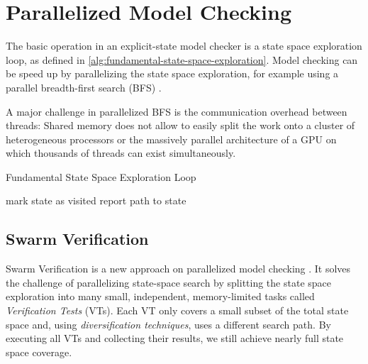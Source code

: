 \documentclass[
fancyheadings, %
%
%
]{stsreprt}
\begin{document}
\section{Parallelized Model Checking}
\label{section:background:parallelized-model-checking}

The basic operation in an explicit-state model checker is a state space exploration loop, as defined in \cref{alg:fundamental-state-space-exploration}.
Model checking can be speed up by parallelizing the state space exploration, for example using a parallel breadth-first search (BFS) \cite{Holzmann2012.Paralellizing-SPIN}.

A major challenge in parallelized BFS is the communication overhead between threads:
Shared memory does not allow to easily split the work onto a cluster of heterogeneous processors or the massively parallel architecture of a GPU on which thousands of threads can exist simultaneously.

\begin{algorithm}
    \caption{Fundamental State Space Exploration Loop}
    \label{alg:fundamental-state-space-exploration}
    \begin{algorithmic}
        \State mark state as visited
        \State report path to state
        \EndIf
        \EndWhile
    \end{algorithmic}
\end{algorithm}

\subsection{Swarm Verification}
\label{section:background:swarm-verification}

Swarm Verification is a new approach on parallelized model checking \cite{Holzmann2008.Swarm-Verification}.
It solves the challenge of parallelizing state-space search by splitting the state space exploration into many small, independent, memory-limited tasks called \emph{Verification Tests} (VTs).
Each VT only covers a small subset of the total state space and, using \emph{diversification techniques}, uses a different search path.
By executing all VTs and collecting their results, we still achieve nearly full state space coverage.
\end{document}
